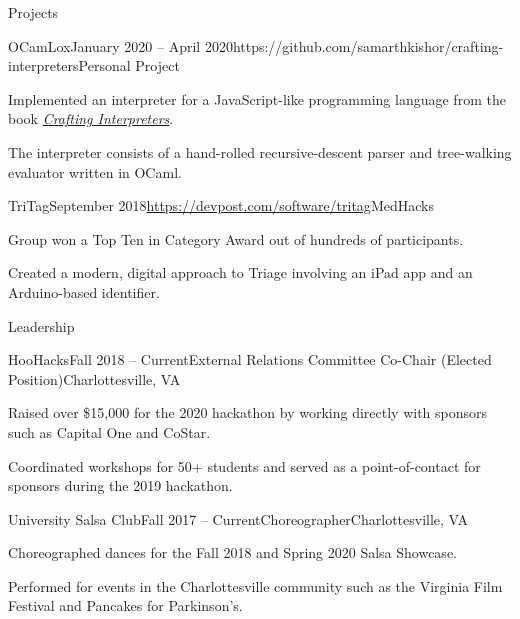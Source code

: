 \documentclass{resume}
\begin{document}
\begin{rSection}{Projects}

  \begin{rSubsection}{OCamLox}{January 2020 -- April 2020}{https://github.com/samarthkishor/crafting-interpreters}{Personal Project}
    \item Implemented an interpreter for a JavaScript-like programming language from the book \href{https://craftinginterpreters.com/}{\textit{Crafting Interpreters}}.
    \item The interpreter consists of a hand-rolled recursive-descent parser and tree-walking evaluator written in OCaml.
  \end{rSubsection}

  \begin{rSubsection}{TriTag}{September 2018}{\url{https://devpost.com/software/tritag}}{MedHacks}
    \item Group won a Top Ten in Category Award out of hundreds of participants.
    \item Created a modern, digital approach to Triage involving an iPad app and an Arduino-based identifier.
  \end{rSubsection}

\end{rSection}

\begin{rSection}{Leadership}

  \begin{rSubsection}{HooHacks}{Fall 2018 -- Current}{External Relations Committee Co-Chair (Elected Position)}{Charlottesville, VA}
    \item Raised over \$15,000 for the 2020 hackathon by working directly with sponsors such as Capital One and CoStar.
    \item Coordinated workshops for 50+ students and served as a point-of-contact for sponsors during the 2019 hackathon.
  \end{rSubsection}

  \begin{rSubsection}{University Salsa Club}{Fall 2017 -- Current}{Choreographer}{Charlottesville, VA}
    \item Choreographed dances for the Fall 2018 and Spring 2020 Salsa Showcase.
    \item Performed for events in the Charlottesville community such as the Virginia Film Festival and Pancakes for Parkinson's.
  \end{rSubsection}

\end{rSection}
\end{document}
